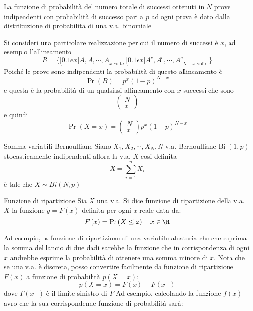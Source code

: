 \begin{tcolorbox}
	La funzione di probabilità del numero totale di successi ottenuti in $N$ prove indipendenti con probabilità di successo pari a $p$ ad ogni prova è dato dalla distribuzione di probabilità di una v.a. binomiale
\end{tcolorbox}

Si consideri una particolare realizzazione per cui il numero di successi è $x$, ad esempio l'allineamento
\[
	B=\{\underbracket[0.1ex]{A, A, \cdots, A}_{x \text { volte }} \underbracket[0.1ex]{A^c, A^c, \cdots, A^c}_{N-x \text { volte }}\}
\]
Poiché le prove sono indipendenti la probabilità di questo allineamento è
\[
	\Pr(B)=p^x(1-p)^{N-x}
\]
e questa è la probabilità di un qualsiasi allineamento con $x$ successi che sono
\[
	\left(\begin{array}{l}
			N \\
			x
		\end{array}\right)
\]
e quindi
\[
	\Pr(X=x)=\left(\begin{array}{l}
			N \\
			x
		\end{array}\right) p^x(1-p)^{N-x}
\]
\begin{teorema}{Somma variabili Bernoulliane}
	Siano $X_1, X_2, \cdots, X_N, N$ v.a. Bernoulliane Bi $(1, p)$ stocasticamente indipendenti allora la v.a. $X$ cosi definita
	\[
		X=\sum_{i=1}^n X_i
	\]
	è tale che $X \sim B i(N, p)$
\end{teorema}
\begin{definizione}{Funzione di ripartizione}
	Sia $ X $ una v.a. Si dice \underline{funzione di ripartizione} della v.a. $ X $ la funzione $ y = F\left(x\right) $ definita per ogni $ x $ reale data da:
	\[
		F\left(x\right) =\Pr\left(X \le x\right) \quad  x \in  \R
	\]
\end{definizione}
Ad esempio, la funzione di ripartizione di una variabile aleatoria che che esprima la somma del lancio di due dadi sarebbe la funzione che in corrispondenza di ogni $ x $ andrebbe esprime la probabilità di ottenere una somma minore di $ x $. Nota che se una v.a. è discreta, posso convertire facilmente da funzione di ripartizione $ F\left(x\right) $ a funzione di probabilità $ p\left(X = x\right) $:
\[
	p\left(X = x\right)  = F\left(x\right) - F\left(x^{-}\right)
\]
dove $ F\left(x^{-}\right) $ è il limite sinistro di $ F $
\vskip3mm
Ad esempio, calcolando la funzione $ f\left(x\right) $ avro che la sua corrispondende funzione di probabilità sarà:
\vskip3mm
